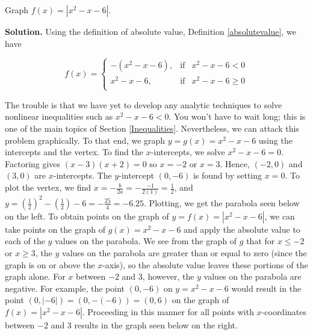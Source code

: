\begin{ex}  Graph $f(x) = |x^2 - x - 6|$.

\smallskip

{\bf Solution.}  Using the definition of absolute value, Definition \ref{absolutevalue}, we have

\setlength{\extrarowheight}{0pt}
\[ f(x) = \left\{ \begin{array}{rcl} -\left(x^2 - x - 6\right), & \mbox{if} & x^2 - x - 6 < 0  \\ x^2 - x - 6, & \mbox{if} & x^2 - x - 6 \geq 0 \\ \end{array} \right.\]
\setlength{\extrarowheight}{2pt}

The trouble is that we have yet to develop any analytic techniques to solve nonlinear inequalities such as $x^2 - x - 6 < 0$.  You won't have to wait long; this is one of the main topics of Section \ref{Inequalities}.  Nevertheless, we can attack this problem graphically.  To that end, we graph $y = g(x) = x^2 - x-6$ using the intercepts and the vertex.  To find the $x$-intercepts, we solve $x^2 - x - 6 = 0$.  Factoring gives $(x-3)(x+2)=0$ so $x=-2$ or $x=3$.  Hence, $(-2,0)$ and $(3,0)$ are $x$-intercepts. The $y$-intercept $(0,-6)$ is found by setting $x=0$.  To plot the vertex, we find $x = -\frac{b}{2a} = -\frac{-1}{2(1)} = \frac{1}{2}$, and $y =  \left(\frac{1}{2}\right)^2 - \left(\frac{1}{2}\right)-6 = -\frac{25}{4} = -6.25$.  Plotting, we get the parabola seen below on the left.  To obtain points on the graph of $y = f(x) = |x^2-x-6|$, we can take points on the graph of $g(x) =  x^2-x-6$ and apply the absolute value to each of the $y$ values on the parabola.  We see from the graph of $g$ that for $x \leq -2$ or $x \geq 3$, the $y$ values on the parabola are greater than or equal to zero (since the graph is on or above the $x$-axis), so the absolute value leaves these portions of the graph alone.  For $x$ between $-2$ and $3$, however, the $y$ values on the parabola are negative.  For example, the point $(0,-6)$ on $y = x^2-x-6$ would result in the point $(0,|-6|) = (0,-(-6))= (0,6)$ on the graph of $f(x) = |x^2-x-6|$.  Proceeding in this manner for all points with $x$-coordinates between $-2$ and $3$ results in the graph seen below on the right.

\[ \begin{array}{cc}


\end{array}\]
\end{ex}
